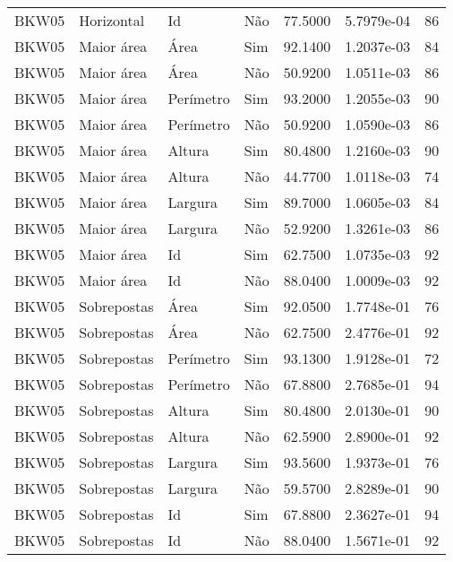 \begin{tabular}{llllrrr}
BKW05     & Horizontal  & Id        & Não         & 77.5000      & 5.7979e-04 & 86       \\
BKW05     & Maior área  & Área      & Sim         & 92.1400      & 1.2037e-03 & 84       \\
BKW05     & Maior área  & Área      & Não         & 50.9200      & 1.0511e-03 & 86       \\
BKW05     & Maior área  & Perímetro & Sim         & 93.2000      & 1.2055e-03 & 90       \\
BKW05     & Maior área  & Perímetro & Não         & 50.9200      & 1.0590e-03 & 86       \\
BKW05     & Maior área  & Altura    & Sim         & 80.4800      & 1.2160e-03 & 90       \\
BKW05     & Maior área  & Altura    & Não         & 44.7700      & 1.0118e-03 & 74       \\
BKW05     & Maior área  & Largura   & Sim         & 89.7000      & 1.0605e-03 & 84       \\
BKW05     & Maior área  & Largura   & Não         & 52.9200      & 1.3261e-03 & 86       \\
BKW05     & Maior área  & Id        & Sim         & 62.7500      & 1.0735e-03 & 92       \\
BKW05     & Maior área  & Id        & Não         & 88.0400      & 1.0009e-03 & 92       \\
BKW05     & Sobrepostas & Área      & Sim         & 92.0500      & 1.7748e-01 & 76       \\
BKW05     & Sobrepostas & Área      & Não         & 62.7500      & 2.4776e-01 & 92       \\
BKW05     & Sobrepostas & Perímetro & Sim         & 93.1300      & 1.9128e-01 & 72       \\
BKW05     & Sobrepostas & Perímetro & Não         & 67.8800      & 2.7685e-01 & 94       \\
BKW05     & Sobrepostas & Altura    & Sim         & 80.4800      & 2.0130e-01 & 90       \\
BKW05     & Sobrepostas & Altura    & Não         & 62.5900      & 2.8900e-01 & 92       \\
BKW05     & Sobrepostas & Largura   & Sim         & 93.5600      & 1.9373e-01 & 76       \\
BKW05     & Sobrepostas & Largura   & Não         & 59.5700      & 2.8289e-01 & 90       \\
BKW05     & Sobrepostas & Id        & Sim         & 67.8800      & 2.3627e-01 & 94       \\
BKW05     & Sobrepostas & Id        & Não         & 88.0400      & 1.5671e-01 & 92       \\
\hline
\end{tabular}